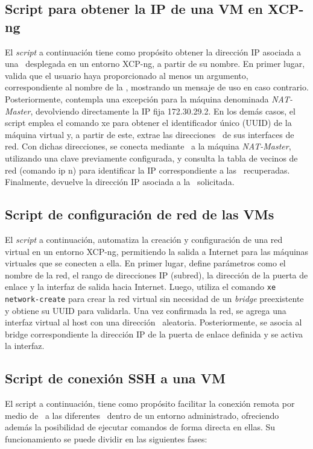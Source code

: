 \subsection{Script para obtener la IP de una VM en XCP-ng}
\noindent
El \textit{script} a continuación tiene como propósito obtener la dirección IP asociada a una \VM\ desplegada en un entorno XCP-ng, a partir de su nombre. En primer lugar, valida que el usuario haya proporcionado al menos un argumento, correspondiente al nombre de la \VM, mostrando un mensaje de uso en caso contrario. Posteriormente, contempla una excepción para la máquina denominada \textit{NAT-Master}, devolviendo directamente la IP fija 172.30.29.2. En los demás casos, el script emplea el comando xe para obtener el identificador único (UUID) de la máquina virtual y, a partir de este, extrae las direcciones \MAC\ de sus interfaces de red. Con dichas direcciones, se conecta mediante \SSH\ a la máquina \textit{NAT-Master}, utilizando una clave previamente configurada, y consulta la tabla de vecinos de red (comando ip n) para identificar la IP correspondiente a las \MAC\ recuperadas. Finalmente, devuelve la dirección IP asociada a la \VM\ solicitada. \\




\subsection{Script de configuración de red de las VMs}
\noindent
El \textit{script} a continuación, automatiza la creación y configuración de una red virtual en un entorno XCP-ng, permitiendo la salida a Internet para las máquinas virtuales que se conecten a ella. En primer lugar, define parámetros como el nombre de la red, el rango de direcciones IP (subred), la dirección de la puerta de enlace y la interfaz de salida hacia Internet. Luego, utiliza el comando \texttt{xe network-create} para crear la red virtual sin necesidad de un \textit{bridge} preexistente y obtiene su UUID para validarla. Una vez confirmada la red, se agrega una interfaz virtual al host con una dirección \MAC\ aleatoria. Posteriormente, se asocia al bridge correspondiente la dirección IP de la puerta de enlace definida y se activa la interfaz.
\noindent


\subsection{Script de conexión SSH a una VM}
\noindent
El script a continuación, tiene como propósito facilitar la conexión remota por medio de \SSH\ a las diferentes \VM\ dentro de un entorno administrado, ofreciendo además la posibilidad de ejecutar comandos de forma directa en ellas. Su funcionamiento se puede dividir en las siguientes fases:

